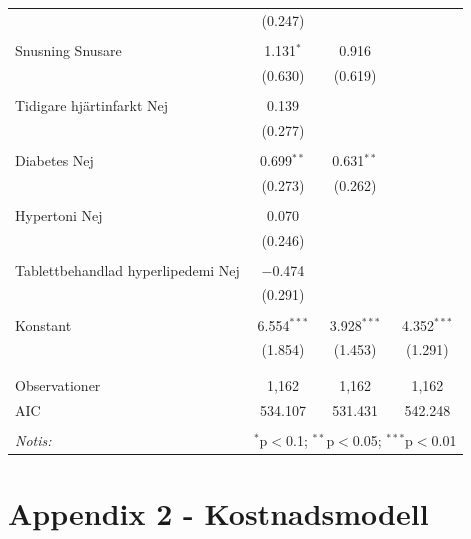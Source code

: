 {\begin{table}[!htbp]
\begin{tabular}{@{\extracolsep{5pt}}lccc}
  & (0.247) &  &  \\ 
  & & & \\ 
 Snusning Snusare & 1.131$^{*}$ & 0.916 &  \\ 
  & (0.630) & (0.619) &  \\ 
  & & & \\ 
 Tidigare hjärtinfarkt Nej & 0.139 &  &  \\ 
  & (0.277) &  &  \\ 
  & & & \\ 
 Diabetes Nej & 0.699$^{**}$ & 0.631$^{**}$ &  \\ 
  & (0.273) & (0.262) &  \\ 
  & & & \\ 
 Hypertoni Nej & 0.070 &  &  \\ 
  & (0.246) &  &  \\ 
  & & & \\ 
 Tablettbehandlad hyperlipedemi Nej & $-$0.474 &  &  \\ 
  & (0.291) &  &  \\ 
  & & & \\ 
 Konstant & 6.554$^{***}$ & 3.928$^{***}$ & 4.352$^{***}$ \\ 
  & (1.854) & (1.453) & (1.291) \\ 
  & & & \\ 
\hline \\[-1.8ex] 
Observationer & 1,162 & 1,162 & 1,162 \\ 
AIC & 534.107 & 531.431 & 542.248 \\ 
\hline 
\hline \\[-1.8ex] 
\textit{Notis:}  & \multicolumn{3}{r}{$^{*}$p$<$0.1; $^{**}$p$<$0.05; $^{***}$p$<$0.01} \\ 
\end{tabular} 
\end{table} 
}

\newpage

\section{Appendix 2 - Kostnadsmodell}

